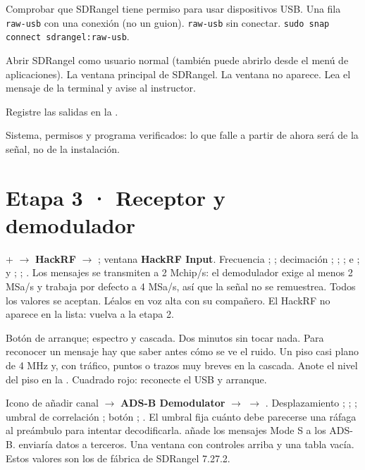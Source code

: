 {Comprobar que SDRangel tiene permiso para usar dispositivos USB.}
{Una fila \texttt{raw-usb} con una conexión (no un guion).}
{\texttt{raw-usb} sin conectar.}
{\texttt{sudo snap connect sdrangel:raw-usb}.}

{Abrir SDRangel como usuario normal (también puede abrirlo desde el menú de aplicaciones).}
{La ventana principal de SDRangel.}
{La ventana no aparece.}
{Lea el mensaje de la terminal y avise al instructor.}

Registre las salidas en la .

\begin{logro}
Sistema, permisos y programa verificados: lo que falle a partir de ahora será de la señal, no de la instalación.
\end{logro}

\section{Etapa 3 · Receptor y demodulador}
\label{sec:u-receptor}


{+ $\rightarrow$ \textbf{HackRF} $\rightarrow$ ; ventana \textbf{HackRF Input}.}
{Frecuencia ;  ; decimación ;  ;  ;  e  ;  y  ;  ;  .}
{Los mensajes se transmiten a 2 Mchip/s: el demodulador exige al menos 2 MSa/s y trabaja por defecto a 4 MSa/s, así que la señal no se remuestrea.}
{Todos los valores se aceptan.}
{Léalos en voz alta con su compañero.}
{El HackRF no aparece en la lista: vuelva a la etapa 2.}

{Botón de arranque; espectro y cascada.}
{Dos minutos sin tocar nada.}
{Para reconocer un mensaje hay que saber antes cómo se ve el ruido.}
{Un piso casi plano de 4 MHz y, con tráfico, puntos o trazos muy breves en la cascada.}
{Anote el nivel del piso en la .}
{Cuadrado rojo: reconecte el USB y arranque.}

{Icono de añadir canal $\rightarrow$ \textbf{ADS-B Demodulator} $\rightarrow$  $\rightarrow$ .}
{Desplazamiento ;  ;  ; umbral de correlación ; botón  ;  .}
{El umbral fija cuánto debe parecerse una ráfaga al preámbulo para intentar decodificarla.  añade los mensajes Mode S a los ADS-B.  enviaría datos a terceros.}
{Una ventana con controles arriba y una tabla vacía. Estos valores son los de fábrica de SDRangel 7.27.2.}
{}
{}

